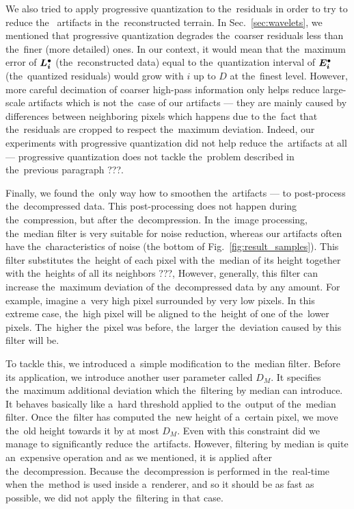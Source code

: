 We also tried to apply progressive quantization to the~residuals in order to try to reduce the~ artifacts in the~reconstructed terrain. In Sec.~\ref{sec:wavelets}, we mentioned that progressive quantization degrades the~coarser residuals less than the~finer (more detailed) ones. In our context, it would mean that the~maximum error of $\objdot{L}{i}$ (the~reconstructed data) equal to the~quantization interval of $\objdot{E}{i}$ (the~quantized residuals) would grow with $i$ up to $D$ at the~finest level. However, more careful decimation of coarser high-pass information only helps reduce large-scale artifacts which is not the~case of our artifacts --- they are mainly caused by differences between neighboring pixels which happens due to the~fact that the~residuals are cropped to respect the~maximum deviation. Indeed, our experiments with progressive quantization did not help reduce the~artifacts at all --- progressive quantization does not tackle the~problem described in the~previous paragraph ???.

Finally, we found the~only way how to smoothen the~artifacts --- to post-process the~decompressed data. This post-processing does not happen during the~compression, but after the~decompression. In the~image processing, the~median filter is very suitable for noise reduction, whereas our artifacts often have the~characteristics of noise (the bottom of Fig.~\ref{fig:result_samples}). This filter substitutes the~height of each pixel with the~median of its height together with the~heights of all its neighbors ???, However, generally, this filter can increase the~maximum deviation of the~decompressed data by any amount. For example, imagine a~very high pixel surrounded by very low pixels. In this extreme case, the~high pixel will be aligned to the~height of one of the~lower pixels. The~higher the~pixel was before, the~larger the~deviation caused by this filter will be.

To tackle this, we introduced a~simple modification to the~median filter. Before its application, we introduce another user parameter called $D_M$. It specifies the~maximum additional deviation which the~filtering by median can introduce. It behaves basically like a~hard threshold applied to the~output of the~median filter. Once the~filter has computed the~new height of a~certain pixel, we move the~old height towards it by at most $D_M$. Even with this constraint did we manage to significantly reduce the~artifacts. However, filtering by median is quite an~expensive operation and as we mentioned, it is applied after the~decompression. Because the~decompression is performed in the~real-time when the~method is used inside a~renderer, and so it should be as fast as possible, we did not apply the~filtering in that case.